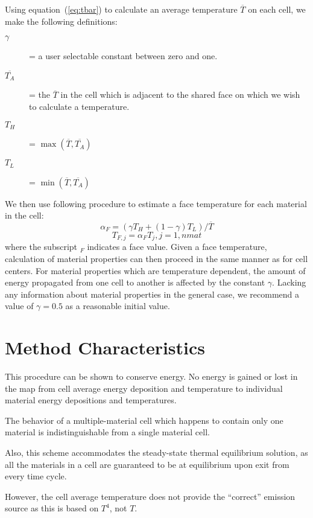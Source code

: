 \documentclass[12pt]{article}
\begin{document}
Using equation~(\ref{eq:tbar}) to calculate an average temperature
 $\overline{T}$ on each cell, we make the following definitions:
\begin{description}
\item[$\gamma$] = a user selectable constant between zero and one.
\item[$\overline{T_{A}}$] = the $\overline{T}$ in the cell which is adjacent
      to the shared face on which we wish to calculate a temperature.
\item[$T_{H}$] = $\max( \overline{T}, \overline{T_{A}})$
\item[$T_{L}$] = $\min( \overline{T}, \overline{T_{A}})$
\end{description}
We then use  following procedure to estimate a face temperature for
each material in the cell:
\begin{equation}
\alpha_{F} = (\gamma T_{H} + (1 - \gamma) T_{L})/\overline{T}
\end{equation}
\begin{equation}
T_{F,j} = \alpha_{F}T_{j}, j=1,nmat
\end{equation}
where the subscript $_{F}$ indicates a face value. Given a face
temperature, calculation of material properties can then proceed
in the same manner as for cell centers.
For material properties which are temperature dependent, the amount of
energy propagated from one cell to another is affected by the
constant $\gamma$. Lacking any information about material properties
in the general case, we recommend a value of $\gamma = 0.5$ as a
reasonable initial value.

\section{Method Characteristics}

This procedure can be shown to conserve energy. No energy is gained or
lost in the map from cell average energy deposition and temperature to
individual material energy depositions and temperatures.

The behavior of a multiple-material cell which happens to contain
only  one material is indistinguishable from a single material cell.

Also, this scheme accommodates the steady-state thermal equilibrium
solution, as all the materials in a cell are guaranteed to be at
equilibrium upon exit from every time cycle.

However, the cell average temperature does not provide the ``correct''
emission source as this is based on $T^4$, not $T$.

\nocite{MihalasMihalas}


\end{document}
